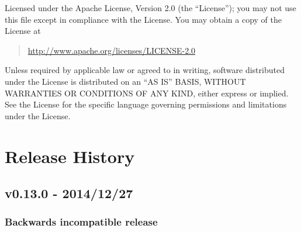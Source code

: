 \documentclass[letterpaper,10pt,english]{sphinxmanual}
\begin{document}
Licensed under the Apache License, Version 2.0 (the ``License'');
you may not use this file except in compliance with the License.
You may obtain a copy of the License at
\begin{quote}

\href{http://www.apache.org/licenses/LICENSE-2.0}{http://www.apache.org/licenses/LICENSE-2.0}
\end{quote}

Unless required by applicable law or agreed to in writing, software
distributed under the License is distributed on an ``AS IS'' BASIS,
WITHOUT WARRANTIES OR CONDITIONS OF ANY KIND, either express or implied.
See the License for the specific language governing permissions and
limitations under the License.


\section{Release History}
\label{release_history::doc}\label{release_history:release-history}

\subsection{v0.13.0 - 2014/12/27}
\label{release_history:v0-13-0-2014-12-27}

\subsubsection{Backwards incompatible release}
\label{release_history:backwards-incompatible-release}
\end{document}
